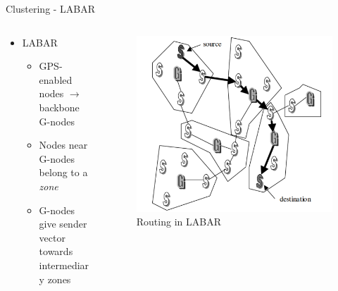 \documentclass[pdftex]{beamer}
\begin{document}
\begin{frame}{Clustering - LABAR}
\begin{columns}
\begin{column}{.5\textwidth}
\begin{itemize}
	\item LABAR \cite{Zaruba2003}
		\begin{itemize}
			\item GPS-enabled nodes $\rightarrow$ backbone G-nodes
			\item Nodes near G-nodes belong to a \emph{zone}
			\item G-nodes give sender vector towards intermediary zones
		\end{itemize}
\end{itemize}
\end{column}

\begin{column}{.5\textwidth}
\begin{figure}
\includegraphics[width=\textwidth]{labar}
\caption{Routing in LABAR}
\end{figure}
\end{column}
\end{columns}
\end{frame}
\end{document}
